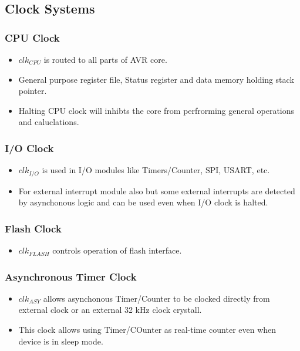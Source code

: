 \documentclass{article}
\begin{document}
\subsection{Clock Systems}
\subsubsection{CPU Clock}
\begin{itemize}
    \item $clk_{CPU}$ is routed to all parts of AVR core.
    \item General purpose register file, Status register and data memory holding stack pointer.
    \item Halting CPU clock will inhibts the core from perfrorming general operations and caluclations.
\end{itemize}

\subsubsection{I/O Clock}
\begin{itemize}
    \item $clk_{I/O}$ is used in I/O modules like Timers/Counter, SPI, USART, etc.
    \item For external interrupt module also but some external interrupts are detected by asynchonous logic and can be used even when I/O clock is halted.
\end{itemize}

\subsubsection{Flash Clock}
\begin{itemize}
    \item $clk_{FLASH}$ controls operation of flash interface.
\end{itemize}


\subsubsection{Asynchronous Timer Clock}
\begin{itemize}
    \item $clk_{ASY}$ allows asynchonous Timer/Counter to be clocked directly from external clock or an external 32 kHz clock crystall.
    \item This clock allows using Timer/COunter as real-time counter even when device is in sleep mode.
\end{itemize}
\end{document}
